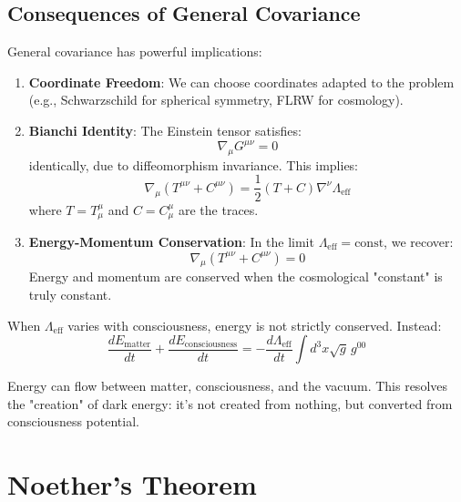 \subsection{Consequences of General Covariance}

General covariance has powerful implications:

\begin{enumerate}
\item \textbf{Coordinate Freedom}: We can choose coordinates adapted to the problem (e.g., Schwarzschild for spherical symmetry, FLRW for cosmology).

\item \textbf{Bianchi Identity}: The Einstein tensor satisfies:
\begin{equation}
\nabla_\mu G^{\mu\nu} = 0
\end{equation}
identically, due to diffeomorphism invariance. This implies:
\begin{equation}
\nabla_\mu \left( T^{\mu\nu} + C^{\mu\nu} \right) = \frac{1}{2}\left( T + C \right) \nabla^\nu \Lambda_{\text{eff}}
\end{equation}
where $T = T^\mu_\mu$ and $C = C^\mu_\mu$ are the traces.

\item \textbf{Energy-Momentum Conservation}: In the limit $\Lambda_{\text{eff}} = \text{const}$, we recover:
\begin{equation}
\nabla_\mu \left( T^{\mu\nu} + C^{\mu\nu} \right) = 0
\end{equation}
Energy and momentum are conserved when the cosmological "constant" is truly constant.
\end{enumerate}

\begin{keyidea}
When $\Lambda_{\text{eff}}$ varies with consciousness, energy is not strictly conserved. Instead:
\begin{equation}
\frac{dE_{\text{matter}}}{dt} + \frac{dE_{\text{consciousness}}}{dt} = -\frac{d\Lambda_{\text{eff}}}{dt} \int d^3x \sqrt{g} \, g^{00}
\end{equation}

Energy can flow between matter, consciousness, and the vacuum. This resolves the "creation" of dark energy: it's not created from nothing, but converted from consciousness potential.
\end{keyidea}

\section{Noether's Theorem}

